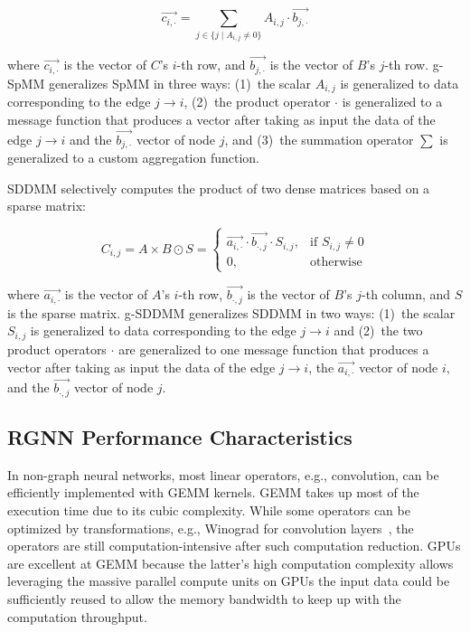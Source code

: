 \begin{equation*}
\overrightarrow{c_{i,\cdot}}=\sum_{j\in\{j\mid A_{i,j}\neq 0\}}A_{i,j}\cdot\overrightarrow{b_{j,\cdot}}
\end{equation*}

where $\overrightarrow{c_{i,\cdot}}$ is the vector of $C$'s $i$-th row, and  $\overrightarrow{b_{j,\cdot}}$ is the vector of $B$'s $j$-th row. g-SpMM generalizes SpMM in three ways: (1)~the scalar $A_{i,j}$ is generalized to data corresponding to the edge $j\rightarrow i$, (2)~the product operator $\cdot$ is generalized to a message function that produces a vector after taking as input the data of the edge $j\rightarrow i$ and the $\overrightarrow{b_{j,\cdot}}$ vector of node $j$, and (3)~the summation operator $\sum$ is generalized to a custom aggregation function.

SDDMM selectively computes the product of two dense matrices based on a sparse matrix:

\begin{equation*}
C_{i,j}=A\times B \odot S =
\begin{cases}
\overrightarrow{a_{i,\cdot}}\cdot \overrightarrow{b_{\cdot,j}} \cdot S_{i,j}, &\text{if } S_{i,j}\neq0\\
0, &\text{otherwise}
\end{cases}
\end{equation*}

where $\overrightarrow{a_{i,\cdot}}$ is the vector of $A$'s $i$-th row, $\overrightarrow{b_{\cdot,j}}$ is the vector of $B$'s $j$-th column, and $S$ is the sparse matrix. g-SDDMM generalizes SDDMM in two ways: (1)~the scalar $S_{i,j}$ is generalized to data corresponding to the edge $j\rightarrow i$ and (2)~the two product operators $\cdot$ are generalized to one message function that produces a vector after taking as input the data of the edge $j\rightarrow i$,  the $\overrightarrow{a_{i,\cdot}}$ vector of node $i$, and the $\overrightarrow{b_{\cdot,j}}$ vector of node $j$.



\subsection{RGNN Performance Characteristics}


In {non-graph neural networks,} 
most linear operators, e.g., convolution, can be efficiently implemented with GEMM kernels. 
GEMM takes up most of the execution time due to its cubic complexity.
While some operators can be optimized by transformations, e.g., Winograd for convolution layers~\cite{lavinFastAlgorithmsConvolutional2015}, the operators are still computation-intensive after such computation reduction.
GPUs are excellent at GEMM because the latter's high computation complexity allows leveraging the massive parallel compute units on GPUs the input data could be sufficiently reused to allow the memory bandwidth to keep up with the computation throughput. 


